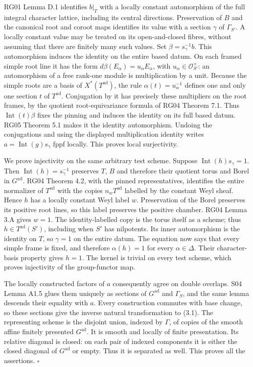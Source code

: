 \documentclass[11pt,a4paper,openany]{report}
\begin{document}
RG01 Lemma D.1 identifies \(b|_T\) with a locally constant automorphism of the full integral character lattice, including its central directions. Preservation of \(B\) and the canonical root and coroot maps identifies its value with a section \(\gamma\) of \(\Gamma_{S'}\). A locally constant value may be treated on its open-and-closed fibres, without assuming that there are finitely many such values. Set \(\beta=s_\gamma^{-1}b\). This automorphism induces the identity on the entire based datum. On each framed simple root line it has the form \(d\beta(E_\alpha)=u_\alpha E_\alpha\), with \(u_\alpha\in\mathcal O_{S'}^\times\): an automorphism of a free rank-one module is multiplication by a unit. Because the simple roots are a basis of \(X^*(T^{\mathrm{ad}})\), the rule \(\alpha(t)=u_\alpha^{-1}\) defines one and only one section \(t\) of \(T^{\mathrm{ad}}\). Conjugation by it has precisely these multipliers on the root frames, by the quotient root-equivariance formula of RG04 Theorem 7.1. Thus \(\operatorname{Int}(t)\beta\) fixes the pinning and induces the identity on its full based datum. RG05 Theorem 5.1 makes it the identity automorphism. Undoing the conjugations and using the displayed multiplication identity writes \(a=\operatorname{Int}(g)s_\gamma\) fppf locally. This proves local surjectivity.

We prove injectivity on the same arbitrary test scheme. Suppose \(\operatorname{Int}(h)s_\gamma=1\). Then \(\operatorname{Int}(h)=s_\gamma^{-1}\) preserves \(T\), \(B\) and therefore their quotient torus and Borel in \(G^{\mathrm{ad}}\). RG04 Theorem 4.2, with the pinned representatives, identifies the entire normalizer of \(T^{\mathrm{ad}}\) with the copies \(n_wT^{\mathrm{ad}}\) labelled by the constant Weyl sheaf. Hence \(h\) has a locally constant Weyl label \(w\). Preservation of the Borel preserves its positive root lines, so this label preserves the positive chamber. RG04 Lemma 3.A gives \(w=1\). The identity-labelled copy is the torus itself as a scheme; thus \(h\in T^{\mathrm{ad}}(S')\), including when \(S'\) has nilpotents. Its inner automorphism is the identity on \(T\), so \(\gamma=1\) on the entire datum. The equation now says that every simple frame is fixed, and therefore \(\alpha(h)=1\) for every \(\alpha\in\Delta\). Their character-basis property gives \(h=1\). The kernel is trivial on every test scheme, which proves injectivity of the group-functor map.

The locally constructed factors of \(a\) consequently agree on double overlaps. S04 Lemma A1.5 glues them uniquely as sections of \(G^{\mathrm{ad}}\) and \(\Gamma_S\), and the same lemma descends their equality with \(a\). Every construction commutes with base change, so these sections give the inverse natural transformation to (3.1). The representing scheme is the disjoint union, indexed by \(\Gamma\), of copies of the smooth affine finitely presented \(G^{\mathrm{ad}}\). It is smooth and locally of finite presentation. Its relative diagonal is closed: on each pair of indexed components it is either the closed diagonal of \(G^{\mathrm{ad}}\) or empty. Thus it is separated as well. This proves all the assertions. \(\square\)
\end{document}

